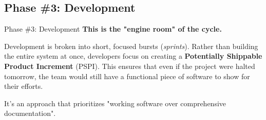 \documentclass[
    notheorems,
    11pt,
    compress,
    aspectratio=169
]{beamer}
\begin{document}

\subsection{Phase \#3: Development}

\begin{frame}{Phase \#3: Development}
    \textbf{This is the "engine room" of the cycle.}

    \vspace{0.25cm}
    
    Development is broken into short, focused bursts (\textit{sprints}). Rather than building the entire system at once, developers focus on creating a \textbf{Potentially Shippable Product Increment} (PSPI). This ensures that even if the project were halted tomorrow, the team would still have a functional piece of software to show for their efforts.

    \pause
    \vspace{0.25cm}
    
    \begin{block}{}
        It’s an approach that prioritizes "working software over comprehensive documentation".
    \end{block}
\end{frame}

\end{document}
